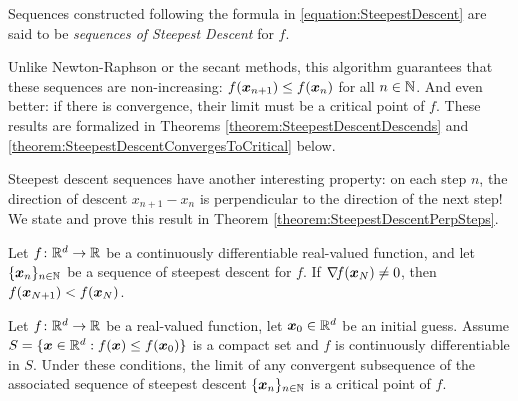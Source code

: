 \begin{remark}
Sequences constructed following the formula in \eqref{equation:SteepestDescent} are said to be \emph{sequences of Steepest Descent} for $f$.

Unlike Newton-Raphson or the secant methods, this algorithm guarantees that these sequences are non-increasing: $f(\boldsymbol{x}_{n+1}) \leq f(\boldsymbol{x}_n)$ for all $n \in \mathbb{N}$.  And even better: if there is convergence, their limit must be a critical point of $f$.  These results are formalized in Theorems \ref{theorem:SteepestDescentDescends} and \ref{theorem:SteepestDescentConvergesToCritical}  below.

Steepest descent sequences have another interesting property: on each step $n$, the direction of descent $x_{n+1} - x_n$ is perpendicular to the direction of the next step!  We state and prove this result in Theorem \ref{theorem:SteepestDescentPerpSteps}.
\end{remark}

\begin{theorem}\label{theorem:SteepestDescentDescends}
Let $f\colon \mathbb{R}^d \to \mathbb{R}$ be a continuously differentiable real-valued function, and let $\{ \boldsymbol{x}_n \}_{n\in\mathbb{N}}$ be a sequence of steepest descent for $f$.  If $\mathop{\nabla\! {f}}(\boldsymbol{x}_N) \neq 0$, then $f(\boldsymbol{x}_{N+1}) < f(\boldsymbol{x}_N)$.
\end{theorem}

\begin{theorem}\label{theorem:SteepestDescentConvergesToCritical}
Let $f\colon \mathbb{R}^d \to \mathbb{R}$ be a real-valued function, let $\boldsymbol{x}_0 \in \mathbb{R}^d$ be an initial guess.  Assume $S = \{ \boldsymbol{x} \in \mathbb{R}^d :  f(\boldsymbol{x}) \leq f(\boldsymbol{x}_0) \}$ is a compact set and $f$ is continuously differentiable in $S$.  Under these conditions, the limit of any convergent subsequence of the associated sequence of steepest descent $\{ \boldsymbol{x}_n \}_{n\in \mathbb{N}}$ is a critical point of $f$.
\end{theorem}

